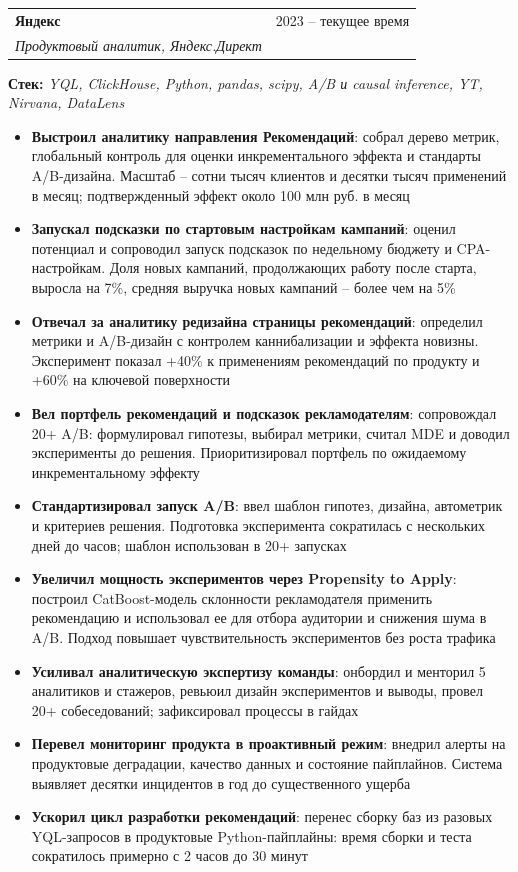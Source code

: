 \documentclass[a4paper,11pt]{article}
\makeatletter
\newcommand{\resumeItem}[2]{
  \item\small{\textbf{#1}{: #2 \vspace{-1pt}}}
}
\newcommand{\resumeSubheading}[4]{
  \vspace{-1pt}\item
    \begin{tabular*}{0.97\textwidth}{l@{\extracolsep{\fill}}r}
      \textbf{#1} & #2 \\
      \textit{\small #3} & \textit{\small #4} \\
    \end{tabular*}\vspace{-5pt}
}
\newcommand{\resumeItemListStart}{\begin{itemize}[leftmargin=16pt, itemsep=3pt, parsep=0pt]}
\newcommand{\resumeItemListEnd}{\end{itemize}\vspace{-5pt}}
\makeatother
\begin{document}
\resumeSubheading{Яндекс}{2023 -- текущее время}
    {Продуктовый аналитик, Яндекс.Директ}{}
    \par\vspace{7pt}
    {\small\textbf{Стек:} \textit{YQL, ClickHouse, Python, pandas, scipy, A/B и causal inference, YT, Nirvana, DataLens}}
    \par\vspace{1pt}
    \resumeItemListStart
        \resumeItem{Выстроил аналитику направления Рекомендаций}{собрал дерево метрик, глобальный контроль для оценки инкрементального эффекта и стандарты A/B-дизайна. Масштаб -- сотни тысяч клиентов и десятки тысяч применений в месяц; подтвержденный эффект около 100 млн руб. в месяц}
\vspace{2pt}
        \resumeItem{Запускал подсказки по стартовым настройкам кампаний}{оценил потенциал и сопроводил запуск подсказок по недельному бюджету и CPA-настройкам. Доля новых кампаний, продолжающих работу после старта, выросла на 7\%, средняя выручка новых кампаний -- более чем на 5\%}
\vspace{2pt}
        \resumeItem{Отвечал за аналитику редизайна страницы рекомендаций}{определил метрики и A/B-дизайн с контролем каннибализации и эффекта новизны. Эксперимент показал +40\% к применениям рекомендаций по продукту и +60\% на ключевой поверхности}
\vspace{2pt}
        \resumeItem{Вел портфель рекомендаций и подсказок рекламодателям}{сопровождал 20+ A/B: формулировал гипотезы, выбирал метрики, считал MDE и доводил эксперименты до решения. Приоритизировал портфель по ожидаемому инкрементальному эффекту}
\vspace{2pt}
        \resumeItem{Стандартизировал запуск A/B}{ввел шаблон гипотез, дизайна, автометрик и критериев решения. Подготовка эксперимента сократилась с нескольких дней до часов; шаблон использован в 20+ запусках}
\vspace{2pt}
        \resumeItem{Увеличил мощность экспериментов через Propensity to Apply}{построил CatBoost-модель склонности рекламодателя применить рекомендацию и использовал ее для отбора аудитории и снижения шума в A/B. Подход повышает чувствительность экспериментов без роста трафика}
\vspace{2pt}
        \resumeItem{Усиливал аналитическую экспертизу команды}{онбордил и менторил 5 аналитиков и стажеров, ревьюил дизайн экспериментов и выводы, провел 20+ собеседований; зафиксировал процессы в гайдах}
\vspace{2pt}
        \resumeItem{Перевел мониторинг продукта в проактивный режим}{внедрил алерты на продуктовые деградации, качество данных и состояние пайплайнов. Система выявляет десятки инцидентов в год до существенного ущерба}
\vspace{2pt}
        \resumeItem{Ускорил цикл разработки рекомендаций}{перенес сборку баз из разовых YQL-запросов в продуктовые Python-пайплайны: время сборки и теста сократилось примерно с 2 часов до 30 минут}
    \resumeItemListEnd
\end{document}
